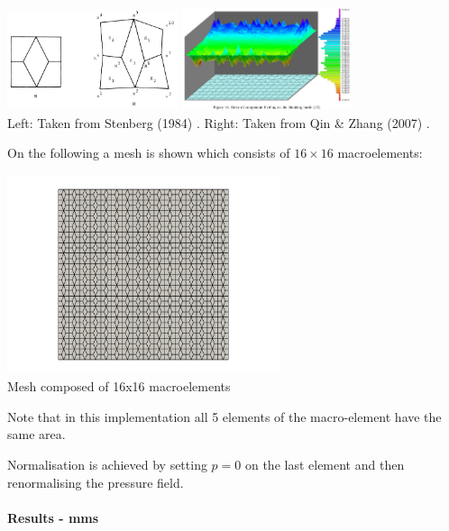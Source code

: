 \begin{center}
\includegraphics[width=5cm]{python_codes/fieldstone_78/images/sten84}
\includegraphics[width=5cm]{python_codes/fieldstone_78/images/qizh07}\\
{\captionfont Left: Taken from Stenberg (1984) \cite{sten84}. 
Right: Taken from Qin \& Zhang (2007) \cite{qizh07}.}
\end{center}

On the following a mesh is shown which consists of $16\times 16$ macroelements:

\begin{center}
\includegraphics[width=8cm]{python_codes/fieldstone_78/images/mesh}\\
{\captionfont Mesh composed of 16x16 macroelements}
\end{center}
Note that in this implementation all 5 elements of the macro-element have the 
same area. 

Normalisation is achieved by setting $p=0$ on the last element and then 
renormalising the pressure field.

\paragraph{Results - mms}

